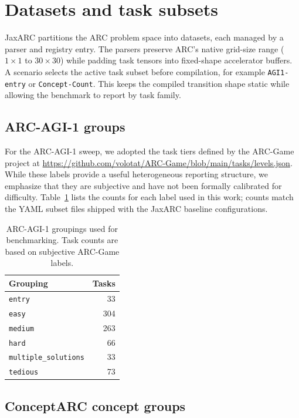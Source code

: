 \section{Datasets and task subsets}
\label{app:datasets}

JaxARC partitions the ARC problem space into datasets, each managed by a parser and registry entry. The parsers preserve ARC's native grid-size range ($1 \times 1$ to $30 \times 30$) while padding task tensors into fixed-shape accelerator buffers. A scenario selects the active task subset before compilation, for example \texttt{AGI1-entry} or \texttt{Concept-Count}. This keeps the compiled transition shape static while allowing the benchmark to report by task family.

\subsection{ARC-AGI-1 groups}
\label{app:arcagi_subsets}

For the ARC-AGI-1 sweep, we adopted the task tiers defined by the ARC-Game project at \url{https://github.com/volotat/ARC-Game/blob/main/tasks/levels.json}. While these labels provide a useful heterogeneous reporting structure, we emphasize that they are subjective and have not been formally calibrated for difficulty. Table~\ref{tab:agi1_subset_counts} lists the counts for each label used in this work; counts match the YAML subset files shipped with the JaxARC baseline configurations.

\begin{table}[htbp]
\centering
\caption{ARC-AGI-1 groupings used for benchmarking. Task counts are based on subjective ARC-Game labels.}
\label{tab:agi1_subset_counts}
\small
\begin{tabular}{@{}lr@{}}
\toprule
\textbf{Grouping} & \textbf{Tasks} \\
\midrule
\texttt{entry} & 33 \\
\texttt{easy} & 304 \\
\texttt{medium} & 263 \\
\texttt{hard} & 66 \\
\texttt{multiple\_solutions} & 33 \\
\texttt{tedious} & 73 \\
\bottomrule
\end{tabular}
\end{table}

\subsection{ConceptARC concept groups}
\label{app:concept_mini}

